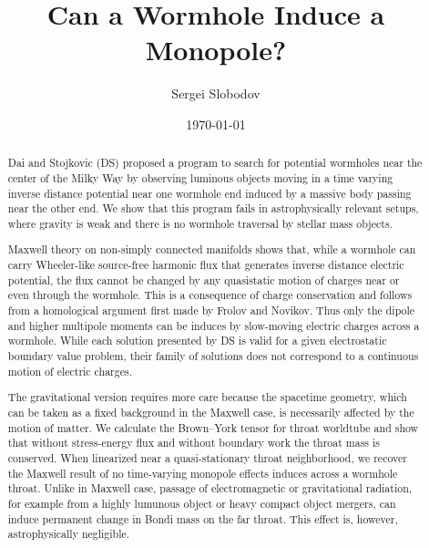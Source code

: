 \documentclass[aps,prd,10pt,onecolumn,nofootinbib,superscriptaddress,floatfix]{revtex4-2}
\begin{document}
\title{Can a Wormhole Induce a Monopole?}

\author{Sergei Slobodov}
\noaffiliation

\date{\today}

\begin{abstract}

Dai and Stojkovic (DS) proposed a program to search for potential wormholes
near the center of the Milky Way by observing luminous objects moving in a time varying
inverse distance potential near one wormhole end induced by a massive body
passing near the other end. We show that this program fails in astrophysically
relevant setups, where gravity is weak and there is no wormhole
traversal by stellar mass objects.

Maxwell theory on non-simply connected manifolds shows that, while a wormhole
can carry Wheeler-like source-free harmonic flux that generates inverse distance
electric potential, the flux cannot be changed by any quasistatic motion of charges near
or even through the wormhole. This is a consequence of charge conservation
and follows from a homological argument first made by Frolov and Novikov.
Thus only the dipole and higher multipole moments can be induces by slow-moving
electric charges across a wormhole. While each solution presented by DS is
valid for a given electrostatic boundary value problem, their family of solutions
does not correspond to a continuous motion of electric charges.

The gravitational version requires more care because the spacetime geometry,
which can be taken as a fixed background in the Maxwell case, is necessarily
affected by the motion of matter. We calculate the Brown--York tensor for throat
worldtube and show that without stress-energy flux and without boundary work
the throat mass is conserved. When linearized near a quasi-stationary throat
neighborhood, we recover the Maxwell result of no time-varying monopole
effects induces across a wormhole throat. Unlike in Maxwell case, passage
of electromagnetic or gravitational radiation, for example from a highly lumunous
object or heavy compact object mergers, can induce permanent change in Bondi mass
on the far throat. This effect is, however, astrophysically negligible.

\end{abstract}

\maketitle
\end{document}
